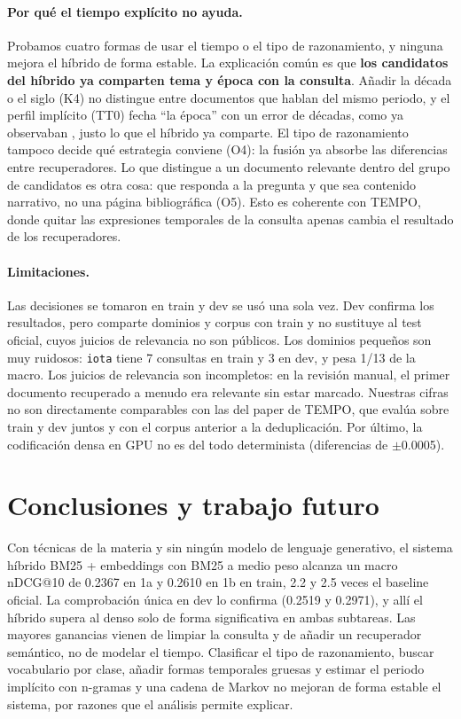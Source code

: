 \documentclass[11pt,a4paper]{article}
\begin{document}
\paragraph{Por qué el tiempo explícito no ayuda.} Probamos cuatro formas de usar el tiempo o el tipo de razonamiento, y ninguna mejora el híbrido de forma estable. La explicación común es que \textbf{los candidatos del híbrido ya comparten tema y época con la consulta}. Añadir la década o el siglo (K4) no distingue entre documentos que hablan del mismo periodo, y el perfil implícito (TT0) fecha ``la época'' con un error de décadas, como ya observaban \citet{jatowt2013focus}, justo lo que el híbrido ya comparte. El tipo de razonamiento tampoco decide qué estrategia conviene (O4): la fusión ya absorbe las diferencias entre recuperadores. Lo que distingue a un documento relevante dentro del grupo de candidatos es otra cosa: que responda a la pregunta y que sea contenido narrativo, no una página bibliográfica (O5). Esto es coherente con TEMPO, donde quitar las expresiones temporales de la consulta apenas cambia el resultado de los recuperadores.

\paragraph{Limitaciones.} Las decisiones se tomaron en train y dev se usó una sola vez. Dev confirma los resultados, pero comparte dominios y corpus con train y no sustituye al test oficial, cuyos juicios de relevancia no son públicos. Los dominios pequeños son muy ruidosos: \texttt{iota} tiene 7 consultas en train y 3 en dev, y pesa 1/13 de la macro. Los juicios de relevancia son incompletos: en la revisión manual, el primer documento recuperado a menudo era relevante sin estar marcado. Nuestras cifras no son directamente comparables con las del paper de TEMPO, que evalúa sobre train y dev juntos y con el corpus anterior a la deduplicación. Por último, la codificación densa en GPU no es del todo determinista (diferencias de $\pm$0.0005).

\section{Conclusiones y trabajo futuro}

Con técnicas de la materia y sin ningún modelo de lenguaje generativo, el sistema híbrido BM25 + embeddings con BM25 a medio peso alcanza un macro nDCG@10 de 0.2367 en 1a y 0.2610 en 1b en train, 2.2 y 2.5 veces el baseline oficial. La comprobación única en dev lo confirma (0.2519 y 0.2971), y allí el híbrido supera al denso solo de forma significativa en ambas subtareas. Las mayores ganancias vienen de limpiar la consulta y de añadir un recuperador semántico, no de modelar el tiempo. Clasificar el tipo de razonamiento, buscar vocabulario por clase, añadir formas temporales gruesas y estimar el periodo implícito con n-gramas y una cadena de Markov no mejoran de forma estable el sistema, por razones que el análisis permite explicar.
\end{document}

